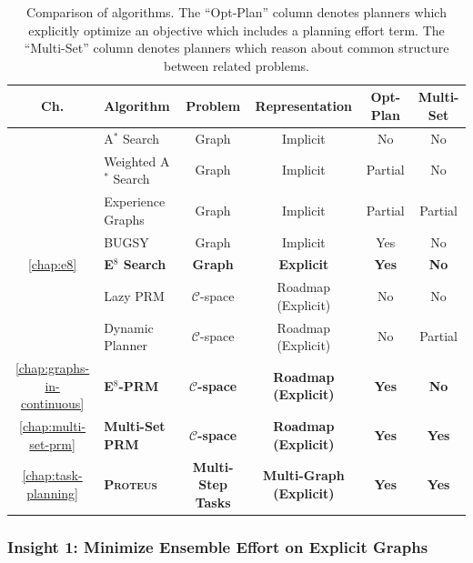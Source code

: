 \begin{table}
{\setlength{\offsetpage}{1in}
\begin{widepage}
   \centering
   {\renewcommand{\arraystretch}{1.2}
   \begin{tabular}{clcccc}
   \toprule
   {\bf Ch.} & Algorithm & Problem & Representation & Opt-Plan & Multi-Set \\
   \midrule
   & A$^*$ Search \cite{hart1968astar} & Graph & Implicit & No & No \\
   & Weighted A$^*$ Search & Graph & Implicit & Partial & No \\
   & Experience Graphs \cite{phillips2012egraphs} & Graph & Implicit & Partial & Partial \\
   & BUGSY \cite{ruml2007bugsy} & Graph & Implicit & Yes & No \\
    \ref{chap:e8}
      & {\bf E$^8$ Search}
      & {\bf Graph} & {\bf Explicit} & {\bf Yes} & {\bf No} \\
   \midrule
   & Lazy PRM \cite{bohlin2000lazyprm} & $\mathcal{C}$-space & Roadmap (Explicit) & No & No \\
   & Dynamic Planner \cite{jaillet2004dynamicprm} & $\mathcal{C}$-space & Roadmap (Explicit) & No & Partial \\
   \ref{chap:graphs-in-continuous}
      & {\bf E$^8$-PRM}
      & {\bf $\mathcal{C}$-space} & {\bf Roadmap (Explicit)} & {\bf Yes} & {\bf No} \\
   \ref{chap:multi-set-prm}
      & {\bf Multi-Set PRM}
      & {\bf $\mathcal{C}$-space} & {\bf Roadmap (Explicit)} & {\bf Yes} & {\bf Yes} \\
   \midrule
   \ref{chap:task-planning}
      & {\bf \textsc{Proteus}}
      & {\bf Multi-Step Tasks} & {\bf Multi-Graph (Explicit)} & {\bf Yes} & {\bf Yes} \\
   \bottomrule
   \end{tabular}
   } %
   \caption{Comparison of algorithms.
      The ``Opt-Plan'' column denotes planners which explicitly
      optimize an objective which includes a planning effort term.
      The ``Multi-Set'' column denotes planners which reason about
      common structure between related problems.}
   \label{table:intro-algorithms}
\end{widepage}
}%
\end{table}

\subsubsection*{Insight 1: Minimize Ensemble Effort on Explicit Graphs}

